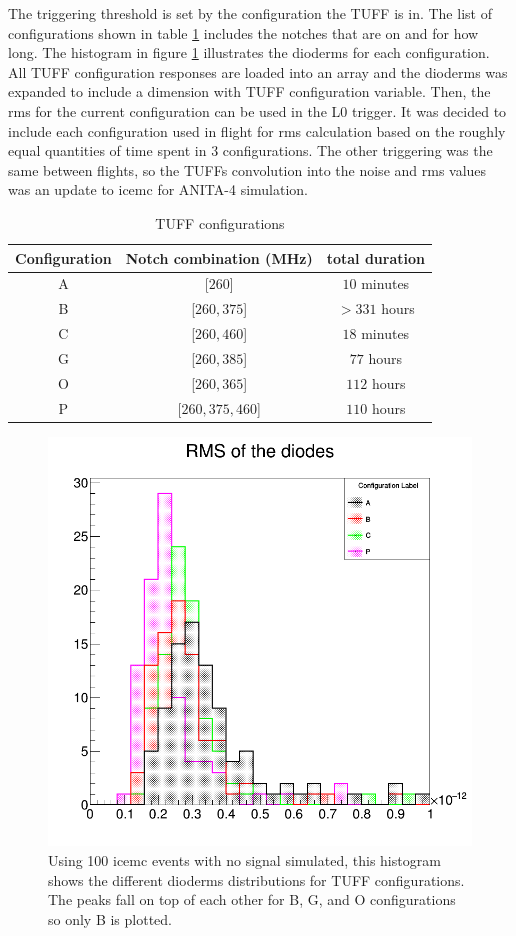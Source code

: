 \documentclass[12pt]{article}
\theoremstyle{plain}
\theoremstyle{definition}
\begin{document}
The triggering threshold is set by the configuration the TUFF is in. The list of configurations shown in table \ref{tab:configs} includes the notches that are on and for how long. The histogram in figure \ref{fig:dioderms} illustrates the dioderms for each configuration. All TUFF configuration responses are loaded into an array and the dioderms was expanded to include a dimension with TUFF configuration variable. Then, the rms for the current configuration can be used in the L0 trigger. It was decided to include each configuration used in flight for rms calculation based on the roughly equal quantities of time spent in 3 configurations. 
The other triggering was the same between flights, so the TUFFs convolution into the noise and rms values was an update to icemc for ANITA-4 simulation.

\begin{table}
\label{tab:configs}
\begin{center}
\caption{TUFF configurations}
\begin{tabular}{c|c|c}
Configuration & Notch combination (MHz) & total duration \\
\hline
A & [$260$] & $10$ minutes \\
B & [$260,375$] & $> 331$ hours \\
C & [$260,460$] & $18$ minutes \\
G & [$260,385$] & $77$ hours \\
O & [$260,365$] & $112$ hours \\
P & [$260,375,460$] & $110$ hours
\end{tabular}
\end{center}
\end{table}

\begin{figure}
\centering
	\includegraphics[scale=0.25]{"diodeRMS_plots/diode_rms_histogram_ABCP"}
	\caption{Using 100 icemc events with no signal simulated, this histogram shows the different dioderms distributions for TUFF configurations. The peaks fall on top of each other for B, G, and O configurations so only B is plotted. }
	\label{fig:dioderms}
\end{figure}
\end{document}
